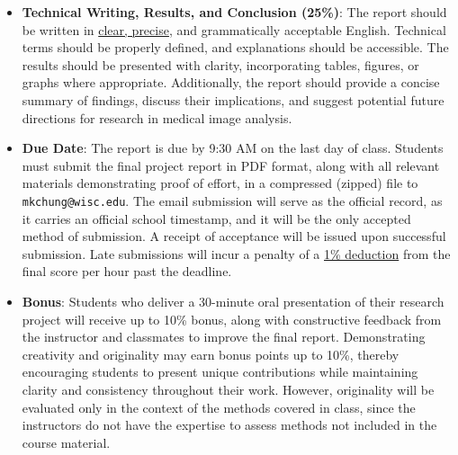 \documentclass[12pt,portrait]{article}
\begin{document}
\begin{itemize}
{\it Example.} If you are implementing a diffusion-based learning method that was not covered in class, you must connect it to the diffusion equation discussed in class and clearly establish the detailed relationship between your approach and the covered diffusion equations. Failure to make this connection explicit will result in a loss of credit.




\item \textbf{Technical Writing, Results, and Conclusion (25\%)}: The report should be written in \underline{clear, precise}, and grammatically acceptable English. Technical terms should be properly defined, and explanations should be accessible. The results should be presented with clarity, incorporating tables, figures, or graphs where appropriate. Additionally, the report should provide a concise summary of findings, discuss their implications, and suggest potential future directions for research in medical image analysis.
    


\item \textbf{Due Date}: The report is due by 9:30 AM on the last day of class. Students must submit the final project report in PDF format, along with all relevant materials demonstrating proof of effort, in a compressed (zipped) file to {\tt mkchung@wisc.edu}. The email submission will serve as the official record, as it carries an official school timestamp, and it will be the only accepted method of submission. A receipt of acceptance will be issued upon successful submission. Late submissions will incur a penalty of a \underline{1\% deduction} from the final score per hour past the deadline.

\item \textbf{Bonus}: Students who deliver a 30-minute oral presentation of their research project will receive up to 10\% bonus, along with constructive feedback from the instructor and classmates to improve the final report. Demonstrating creativity and originality may earn bonus points up to 10\%, thereby encouraging students to present unique contributions while maintaining clarity and consistency throughout their work. However, originality will be evaluated only in the context of the methods covered in class, since the instructors do not have the expertise to assess methods not included in the course material.




\end{itemize}
\end{document}

